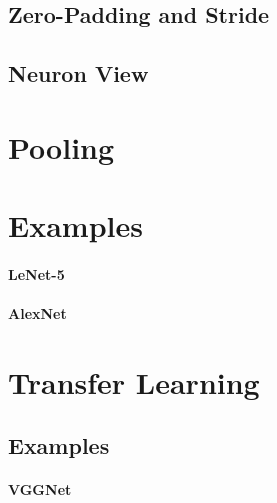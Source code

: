		\subsection{Zero-Padding and Stride} %

		\subsection{Neuron View} %

	\section{Pooling} %

	\section{Examples} %

		\paragraph{LeNet-5} %

		\paragraph{AlexNet} %

	\section{Transfer Learning} %

		\subsection{Examples} %

			\paragraph{VGGNet} %

